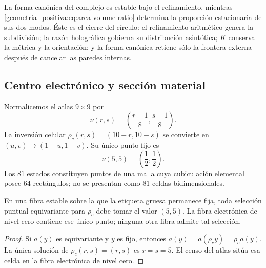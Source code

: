 La forma canónica del complejo es estable bajo el refinamiento, mientras
\eqref{geometria_positiva:eq:area-volume-ratio} determina la proporción estacionaria de sus dos
modos. Éste es el cierre del círculo: el refinamiento aritmético genera la
subdivisión; la razón holográfica gobierna su distribución asintótica; \(K\)
conserva la métrica y la orientación; y la forma canónica retiene sólo la
frontera externa después de cancelar las paredes internas.

\subsection{Centro electrónico y sección material}

Normalicemos el atlas \(9\times9\) por
\[
 \nu(r,s)=\left(\frac{r-1}{8},\frac{s-1}{8}\right).
\]
La inversión celular \(\rho_c(r,s)=(10-r,10-s)\) se convierte en
\((u,v)\mapsto(1-u,1-v)\). Su único punto fijo es
\begin{equation}
 \nu(5,5)=\left(\frac12,\frac12\right).
 \label{geometria_positiva:eq:electron-center}
\end{equation}
Los \(81\) estados constituyen puntos de una malla cuya cubiculación elemental
posee \(64\) rectángulos; no se presentan como \(81\) celdas bidimensionales.

\begin{theorem}
\label{geometria_positiva:thm:electron-equivariant-section}
En una fibra estable sobre la que la etiqueta gruesa permanece fija, toda
selección puntual equivariante para \(\rho_c\) debe tomar el valor \((5,5)\).
La fibra electrónica de nivel cero contiene ese único punto; ninguna otra
fibra admite tal selección.
\end{theorem}
\begin{proof}
Si \(a(y)\) es equivariante y \(y\) es fijo, entonces
\(a(y)=a(\rho_cy)=\rho_ca(y)\). La única solución de
\(\rho_c(r,s)=(r,s)\) es \(r=s=5\). El censo del atlas sitúa esa celda en la
fibra electrónica de nivel cero.
\end{proof}

